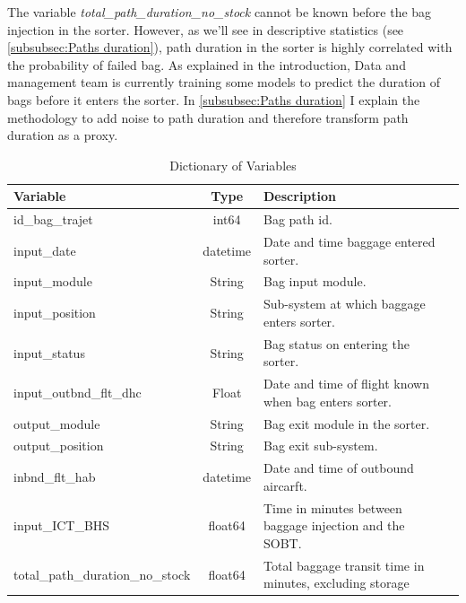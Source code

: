 \documentclass[12pt]{article}
\begin{document}
\noindent The variable \textit{total\_path\_duration\_no\_stock} cannot be known before the bag injection in the sorter. However, as we'll see in descriptive statistics (see \autoref{subsubsec:Paths duration}), path duration in the sorter is highly correlated with the probability of failed bag. As explained in the introduction, Data and management team is currently training some models to predict the duration of bags before it enters the sorter. In \autoref{subsubsec:Paths duration} I explain the methodology to add noise to path duration and therefore transform path duration as a proxy.

\newpage
\FloatBarrier
\begin{table}[ht]
    \centering
    \caption{Dictionary of Variables}
    \label{tab:variables}
    \begin{tabularx}{\textwidth}{lclX}
        \toprule
        \textbf{Variable} & \textbf{Type} & \textbf{Description} \\
        \midrule
        id\_bag\_trajet & int64 & Bag path id. \\
        input\_date & datetime & Date and time baggage entered sorter. \\
        input\_module & String & Bag input module. \\
        input\_position & String & Sub-system at which baggage enters sorter. \\
        input\_status & String & Bag status on entering the sorter. \\
        input\_outbnd\_flt\_dhc & Float & Date and time of flight known when bag enters sorter. \\
        output\_module & String & Bag exit module in the sorter. \\
        output\_position & String & Bag exit sub-system. \\
        inbnd\_flt\_hab & datetime &  Date and time of outbound aircarft.\\
        input\_ICT\_BHS & float64 & Time in minutes between baggage injection and the SOBT. \\
        total\_path\_duration\_no\_stock & float64 & Total baggage transit time in minutes, excluding storage \\

\end{tabularx}
\end{table}
\end{document}
